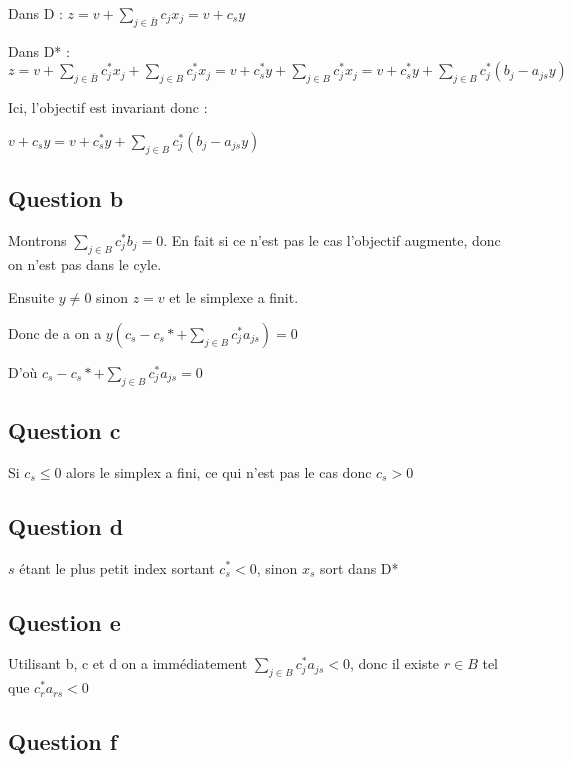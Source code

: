 \documentclass{article}
\begin{document}
Dans D : $z=v+\sum_{j\in \bar{B}}c_j x_j=v+c_s y$

Dans D* : $z=v+\sum_{j\in \bar{B}}c_j^* x_j+\sum_{j\in B}c_j^* x_j=v+c_s^* y+\sum_{j\in B}c_j^* x_j=v+c_s^* y+\sum_{j\in B}c_j^* (b_j-a_{js}y)$

Ici, l'objectif est invariant donc :

$v+c_s y=v+c_s^* y+\sum_{j\in B}c_j^* (b_j-a_{js}y)$

\subsection*{Question b}

Montrons $\sum_{j\in B}c_j^* b_j=0$. En fait si ce n'est pas le cas l'objectif augmente, donc on n'est pas dans le cyle.

Ensuite $y\neq 0$ sinon $z = v$ et le simplexe a finit.

Donc de a on a $y\left (c_s-c_s*+\sum_{j\in B}c_j^* a_{js}\right )=0$

D'où $c_s-c_s*+\sum_{j\in B}c_j^* a_{js}=0$


\subsection*{Question c}

Si $c_s\leq 0$ alors le simplex a fini, ce qui n'est pas le cas donc $c_s>0$

\subsection*{Question d}

$s$ étant le plus petit index sortant $c_s^*<0$, sinon $x_s$ sort dans D*

\subsection*{Question e} 

Utilisant b, c et d on a immédiatement $\sum_{j\in B}c_j^* a_{js}<0$, donc il existe $r \in B$ tel que $c_r^* a_{rs}<0$

\subsection*{Question f} 


\end{document}
